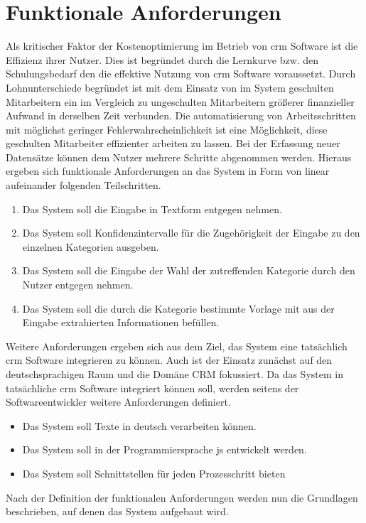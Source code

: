\chapter{Funktionale Anforderungen}
Als kritischer Faktor der Kostenoptimierung im Betrieb von \gls{crm} Software ist die Effizienz ihrer Nutzer. Dies ist begründet durch die Lernkurve bzw. den Schulungsbedarf den die effektive Nutzung von \gls{crm} Software voraussetzt. Durch Lohnunterschiede  begründet ist mit dem Einsatz von im System geschulten Mitarbeitern ein im Vergleich zu ungeschulten Mitarbeitern  größerer finanzieller Aufwand in derselben Zeit verbunden. Die automatisierung von Arbeitsschritten mit möglichst geringer Fehlerwahrscheinlichkeit ist eine Möglichkeit, diese geschulten Mitarbeiter effizienter arbeiten zu lassen. Bei der Erfassung neuer Datensätze können dem Nutzer mehrere Schritte abgenommen werden.  Hieraus ergeben sich funktionale Anforderungen an das System in Form von linear aufeinander folgenden Teilschritten.
\begin{enumerate}
    \item Das System soll die Eingabe in Textform entgegen nehmen.
    \item Das System soll Konfidenzintervalle für die Zugehörigkeit der Eingabe zu den einzelnen Kategorien ausgeben.
    \item Das System soll die Eingabe der Wahl der zutreffenden Kategorie durch den Nutzer entgegen nehmen.
    \item Das System soll die durch die Kategorie bestimmte Vorlage mit aus der Eingabe extrahierten Informationen befüllen.
\end{enumerate}

Weitere Anforderungen ergeben sich aus dem Ziel, das System eine tatsächlich \gls{crm} Software integrieren zu können. Auch ist der Einsatz zunächst auf den deutschsprachigen Raum und die Domäne CRM fokussiert. 
Da das System in tatsächliche \gls{crm} Software integriert können soll, werden seitens der Softwareentwickler weitere Anforderungen definiert.
\begin{itemize}
    \item Das System soll Texte in deutsch verarbeiten können.
    \item Das System soll in der Programmiersprache \gls{js} entwickelt werden.
    \item Das System soll Schnittstellen für jeden Prozesschritt bieten
\end{itemize}
Nach der Definition der funktionalen Anforderungen werden nun die Grundlagen beschrieben, auf denen das System aufgebaut wird.

